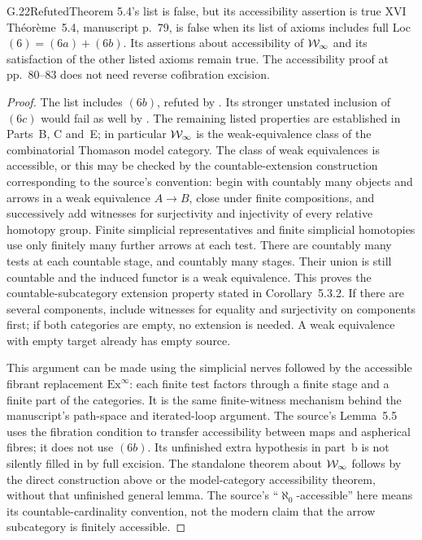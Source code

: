 \begin{claim}{G.22}{Refuted}{Theorem 5.4's list is false, but its accessibility assertion is true}
XVI Th\'eor\`eme~5.4, manuscript p.~79, is false when its list of axioms includes full Loc~$(6)=(6a)+(6b)$. Its assertions about accessibility of $\mathcal{W}_{\infty}$ and its satisfaction of the other listed axioms remain true. The accessibility proof at pp.~80--83 does not need reverse cofibration excision.
\end{claim}
\begin{proof}
The list includes $(6b)$, refuted by . Its stronger unstated inclusion of $(6c)$ would fail as well by . The remaining listed properties are established in Parts~B, C and~E; in particular $\mathcal{W}_{\infty}$ is the weak-equivalence class of the combinatorial Thomason model category. The class of weak equivalences is accessible, or this may be checked by the countable-extension construction corresponding to the source's convention: begin with countably many objects and arrows in a weak equivalence $A\to B$, close under finite compositions, and successively add witnesses for surjectivity and injectivity of every relative homotopy group. Finite simplicial representatives and finite simplicial homotopies use only finitely many further arrows at each test. There are countably many tests at each countable stage, and countably many stages. Their union is still countable and the induced functor is a weak equivalence. This proves the countable-subcategory extension property stated in Corollary~5.3.2. If there are several components, include witnesses for equality and surjectivity on components first; if both categories are empty, no extension is needed. A weak equivalence with empty target already has empty source.

This argument can be made using the simplicial nerves followed by the accessible fibrant replacement $\mathrm{Ex}^{\infty}$: each finite test factors through a finite stage and a finite part of the categories. It is the same finite-witness mechanism behind the manuscript's path-space and iterated-loop argument. The source's Lemma~5.5 uses the fibration condition to transfer accessibility between maps and aspherical fibres; it does not use $(6b)$. Its unfinished extra hypothesis in part~b is not silently filled in by full excision. The standalone theorem about $\mathcal{W}_{\infty}$ follows by the direct construction above or the model-category accessibility theorem, without that unfinished general lemma. The source's ``$\aleph_0$-accessible'' here means its countable-cardinality convention, not the modern claim that the arrow subcategory is finitely accessible.
\end{proof}

